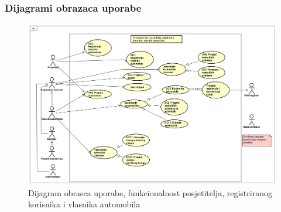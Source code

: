 %	
%								
%								
%							
				
					
				\subsubsection{Dijagrami obrazaca uporabe}
				
					\begin{figure}[H]
						\includegraphics[width=\linewidth]{dijagrami/diagram0.png}
						\centering
						\caption{Dijagram obrasca uporabe, funkcionalnost posjetitelja, registriranog korisnika i vlasnika automobila}
						\label{fig:diagram0}
					\end{figure}
				
